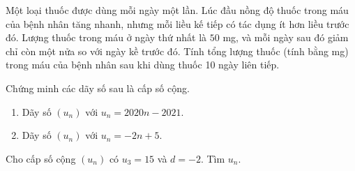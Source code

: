 \begin{bt}%
	Một loại thuốc được dùng mỗi ngày một lần. Lúc đầu nồng độ thuốc trong máu của bệnh nhân tăng nhanh, nhưng mỗi liều kế tiếp có tác dụng ít hơn liều trước đó. Lượng thuốc trong máu ở ngày thứ nhất là $50$ mg, và mỗi ngày sau đó giảm chỉ còn một nửa so với ngày kề trước đó. Tính tổng lượng thuốc (tính bằng mg) trong máu của bệnh nhân sau khi dùng thuốc 10 ngày liên tiếp.
\end{bt}

\begin{vd}%
Chứng minh các dãy số sau là cấp số cộng.
\begin{enumerate}
\item Dãy số $(u_n)$ với $u_n=2020n-2021$.
\item Dãy số $(u_n)$ với $u_n=-2n+5$.
\end{enumerate}
\end{vd}

\begin{vd}%
Cho cấp số cộng $(u_n)$ có $u_3=15$ và $d=-2$. Tìm $u_n$.
\end{vd}

